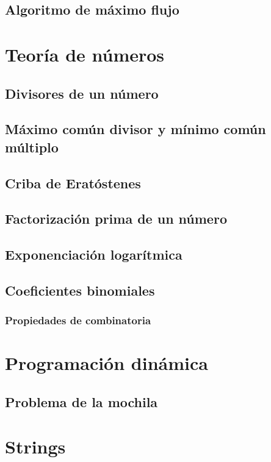 \documentclass[10pt,letterpaper,twocolumn]{article}
\begin{document}
	\subsection{Algoritmo de máximo flujo}
	
	
\section{Teoría de números}
	\subsection{Divisores de un número}
	
	\subsection{Máximo común divisor y mínimo común múltiplo}
	
	\subsection{Criba de Eratóstenes}
	
	\subsection{Factorización prima de un número}
	
	\subsection{Exponenciación logarítmica}
	
	\subsection{Coeficientes binomiales}
		
		\subsubsection{Propiedades de combinatoria}
	
\section{Programación dinámica}
	\subsection{Problema de la mochila}
	
	
\section{Strings}
\end{document}
